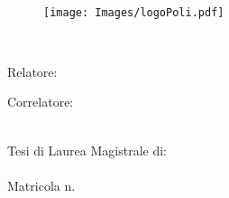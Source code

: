 \begin{titlepage}
    \begin{center}
    	\large
        \spacedlowsmallcaps{\myUni} \\
        \bigskip\myFaculty \\
        \medskip\mySchool \\
    	\medskip\myDepartment \\
    	\bigskip\myCourseFirstPartIT \\
        \medskip\myCourseSecondPartIT \\  

        \hfill

        \vfill
        
        \begin{figure}[!h]
			\begin{center}
				\texttt{[image: Images/logoPoli.pdf]}
			\end{center}
		\end{figure}
		
		\vfill

        \begingroup
       		\huge	
            \color{Maroon} \myTitleIT \\ \bigskip
        \endgroup

        \vfill

		\flushleft 
		\normalsize{Relatore:}\\
		\medskip\spacedlowsmallcaps{\mySupervisor}

		\flushleft
		\normalsize{Correlatore:}\\
		\medskip\spacedlowsmallcaps{\myOtherSupervisor}\\
        
        \vfill  
        
        \flushright
        \normalsize{Tesi di Laurea Magistrale di:}\\
        \medskip \spacedlowsmallcaps{\myFirstAuthorName}\\
		Matricola n. \myMatrFirstAuthor \\ 
		
		\vfill 

		\centering {\myAcademicYearIT}                     

    \end{center}  
\end{titlepage}